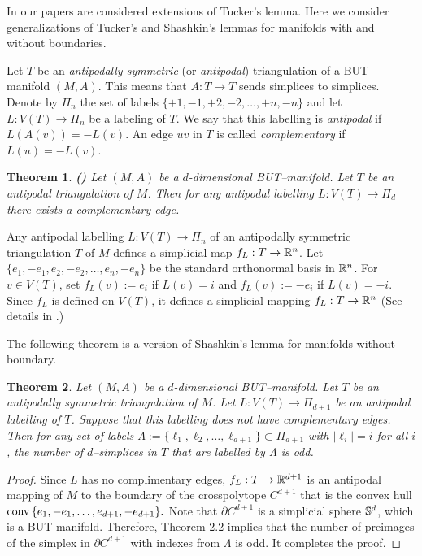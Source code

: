 \documentclass[a4paper,12pt]{article}
\newtheorem{theorem}{Theorem}[section]
\newcommand{\conv}{\mathop{\rm conv}\nolimits}
\begin{document}
In our papers \cite{Mus,MusSpT,MusVo} are considered extensions of Tucker's lemma. Here we consider generalizations of Tucker's and Shashkin's lemmas for manifolds with and without boundaries.


Let $T$ be an {\it antipodally symmetric} (or {\it antipodal}) triangulation of a BUT--manifold $(M,A)$. This means that $A:T\to T$ sends simplices to simplices. Denote by $\Pi_n$ the set of labels $\{+1,-1,+2,-2,\ldots, +n,-n\}$   and let $L:V(T)\to \Pi_n$ be a labeling of $T$. We say that this labelling is {\it antipodal} if $L(A(v))=-L(v)$. An edge $uv$ in $T$ is called {\it complementary} if $L(u)=-L(v)$.

\begin{theorem}{\bf (\cite[Theorem 4.1]{MusSpT})} \label{TBUT} Let $(M,A)$ be a $d$-dimensional BUT--manifold. Let $T$ be an antipodal triangulation of   $M$.   Then for any antipodal  labelling $L:V(T)\to \Pi_d$  there exists a complementary edge.
\end{theorem}

Any antipodal labelling $L:V(T)\to \Pi_n$ of an antipodally symmetric triangulation $T$ of $M$  defines a simplicial map $f_L:T\to {\Bbb R}^n$. Let $\{e_1,-e_1,e_2,-e_2,\ldots,e_n,-e_n\}$ be the standard orthonormal basis in ${\Bbb R}^n$.
For $v\in V(T)$, set $f_L(v):=e_i$ if $L(v)=i$ and  $f_L(v):=-e_i$ if $L(v)=-i$. Since $f_L$ is defined on $V(T)$,  it defines a simplicial  mapping $f_L:T\to  {\Bbb R}^n$ (See details in \cite[Sec. 2.3]{Mat}.)

The following theorem is a version of Shashkin's lemma for manifolds without boundary.

\begin{theorem} \label{SBUT} Let $(M,A)$ be a $d$-dimensional BUT--manifold. Let $T$ be an antipodally symmetric triangulation of   $M$.   Let $L:V(T)\to \Pi_{d+1}$  be an antipodal  labelling of $T$.  Suppose that this labelling does not have complementary edges. Then for any set of  labels $\Lambda:=\{\ell_1,\ell_2,\ldots,\ell_{d+1}\}\subset\Pi_{d+1}$ with $|\ell_i|=i$ for all $i$, the number of $d$--simplices in $T$ that are labelled by $\Lambda$  is odd.
\end{theorem}
\begin{proof} Since $L$ has no complimentary edges, $f_L:T\to  {\Bbb R}^{d+1}$ is an antipodal mapping of $M$ to the boundary of the crosspolytope $C^{d+1}$ that is the  convex hull
$
\conv{\{e_1,-e_1,\ldots,e_{d+1},-e_{d+1}\}}.
$
Note that $\partial C^{d+1}$ is a simplicial sphere ${\Bbb S}^d$, which is a BUT-manifold. Therefore, 
Theorem 2.2 implies that the number of preimages of the simplex in  $\partial C^{d+1}$ with indexes from $\Lambda$ is odd. It completes the proof.
\end{proof}
\end{document}
